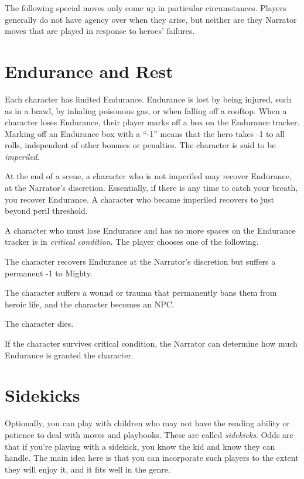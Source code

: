 \documentclass[letterpaper]{report}
\begin{document}
The following special moves only come up in particular circumstances.
Players generally do not have agency over when they arise,
but neither are they Narrator moves that are played in response
to heroes' failures.



\section{Endurance and Rest}

Each character has limited Endurance. Endurance is lost by being
injured, such as in a brawl, by inhaling poisonous gas, or when
falling off a rooftop. When a character loses Endurance, their
player marks off a box on the Endurance tracker.
Marking off an Endurance box with a ``-1'' means that the hero takes
-1 to all rolls, independent of other bonuses or penalties.
The character is said to be \emph{imperiled}.

At the end of a scene, a character who is not imperiled may recover
Endurance, at the Narrator's discretion. Essentially, if there is any
time to catch your breath, you recover Endurance. A character who
became imperiled recovers to just beyond peril threshold.

A character who must lose Endurance and has no more spaces on the
Endurance tracker is in \emph{critical condition}. The player chooses one of
the following.
\begin{choices}
\item The character recovers Endurance at the Narrator's discretion but
  suffers a permanent -1 to Mighty. 
\item The character suffers a wound or trauma that permanently
  bans them from heroic life, and the character becomes
  an NPC.
\item The character dies.
\end{choices}
If the character survives critical condition, the Narrator can
determine how much Endurance is granted the character.

\section{Sidekicks}

Optionally, you can play \kapow{} with children who may not have the
reading ability or patience to deal with moves and playbooks.
These are called \emph{sidekicks}.
Odds are that if you're playing with a sidekick, you know the kid
and know they can handle.  The main idea here is that
you can incorporate such players to the extent they will enjoy it, and
it fits well in the genre.
\end{document}
